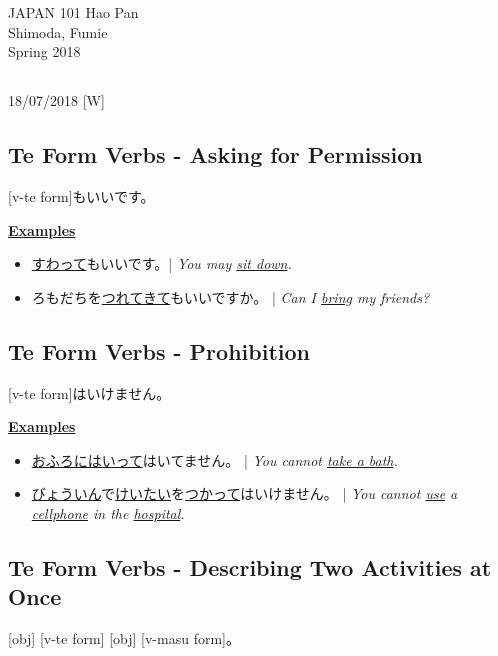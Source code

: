 \documentclass{article}
\begin{document}
 \begin{CJK}{UTF8}{min}

\noindent
{JAPAN 101 \hfill Hao Pan}\\
{Shimoda, Fumie}\\
{Spring 2018}


\begin{center}
\section{}
\noindent
{\hfill 18/07/2018 [W]}
\end{center}

\subsection{Te Form Verbs - Asking for Permission}
[v-te form]もいいです。

\bigskip

\uline{\bf Examples}
\begin{itemize}
\item \uline{すわって}もいいです。| \emph{You may \uline{sit down}.}
\item ろもだちを\uline{つれてきて}もいいですか。 | \emph{Can I \uline{bring} my friends?}
\end{itemize}

\subsection{Te Form Verbs - Prohibition}
[v-te form]はいけません。

\bigskip

\uline{\bf Examples}
\begin{itemize}
\item \uline{おふろにはいって}はいてません。 | \emph{You cannot \uline{take a bath}.}
\item \uline{びょういん}で\uline{けいたい}を\uline{つかって}はいけません。 | \emph{You cannot \uline{use} a \uline{cellphone} in the \uline{hospital}.}
\end{itemize}

\subsection{Te Form Verbs - Describing Two Activities at Once}
[obj] [v-te form] [obj] [v-masu form]。


\end{CJK}
\end{document}
